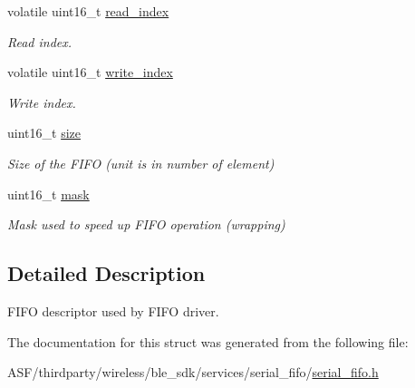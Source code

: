 \begin{DoxyCompactItemize}
\begin{tabbing}
\end{tabbing}\item 
volatile uint16\+\_\+t \mbox{\hyperlink{group__fifo__group_ga926074dbb263b916922202b938daf3ad}{read\+\_\+index}}
\begin{DoxyCompactList}\small\item\em Read index. \end{DoxyCompactList}\item 
volatile uint16\+\_\+t \mbox{\hyperlink{group__fifo__group_gaa10e623e08c4046864b5c1507a97a9ed}{write\+\_\+index}}
\begin{DoxyCompactList}\small\item\em Write index. \end{DoxyCompactList}\item 
uint16\+\_\+t \mbox{\hyperlink{group__fifo__group_gaaba88b24a21a6c70c895c0d55f4a69a0}{size}}
\begin{DoxyCompactList}\small\item\em Size of the F\+I\+FO (unit is in number of \textquotesingle{}element\textquotesingle{}) \end{DoxyCompactList}\item 
uint16\+\_\+t \mbox{\hyperlink{group__fifo__group_ga7fd850d4bb04f7410e8e2abf5f349348}{mask}}
\begin{DoxyCompactList}\small\item\em Mask used to speed up F\+I\+FO operation (wrapping) \end{DoxyCompactList}\end{DoxyCompactItemize}


\subsection{Detailed Description}
F\+I\+FO descriptor used by F\+I\+FO driver. 

The documentation for this struct was generated from the following file\+:\begin{DoxyCompactItemize}
\item 
A\+S\+F/thirdparty/wireless/ble\+\_\+sdk/services/serial\+\_\+fifo/\mbox{\hyperlink{serial__fifo_8h}{serial\+\_\+fifo.\+h}}\end{DoxyCompactItemize}
